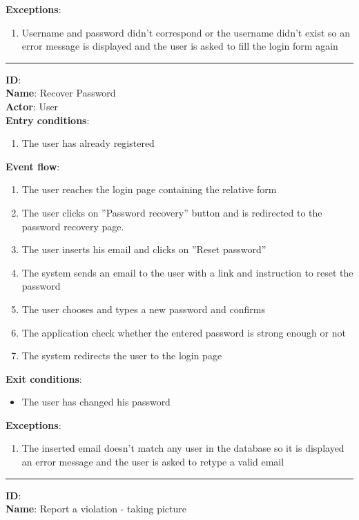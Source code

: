 	\textbf{Exceptions}:
	\begin{enumerate}
    		\item{Username and password didn’t correspond or the username didn’t exist so an error message is displayed and the user is asked to ﬁll the login form again}
 	   \end{enumerate}
	\rule{\linewidth}{0.4pt}
	\textbf{ID}:   \\
	\textbf{Name}: Recover Password \\
	\textbf{Actor}: User \\
	\textbf{Entry conditions}:
	\begin{enumerate}
		\item{The user has already registered}
	\end{enumerate}
	\textbf{Event flow}:
	\begin{enumerate}
		\item{The user reaches the login page containing the relative form}
		\item{The user clicks on ”Password recovery” button and is redirected to the password recovery page.}
		\item{The user inserts his email and clicks on ”Reset password”}
		\item{The system sends an email to the user with a link and instruction to reset the password}
		\item{The user chooses and types a new password and conﬁrms}
		\item{The application check whether the entered password is strong enough or not}
		\item{The system redirects the user to the login page}
	\end{enumerate}
	\textbf{Exit conditions}:
	\begin{itemize}
		\item{The user has changed his password}
	\end{itemize}
	\textbf{Exceptions}:
	\begin{enumerate}
    		\item{The inserted email doesn't match any user in the database so it is displayed an error message and the user is asked to retype a valid email}
 	   \end{enumerate}
	\rule{\linewidth}{0.4pt}
  \textbf{ID}:  \\
  \textbf{Name}: Report a violation - taking picture \\

